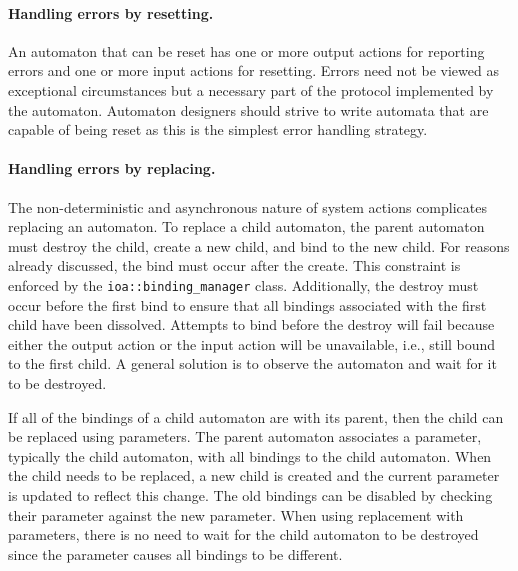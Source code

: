 \paragraph{Handling errors by resetting.}
An automaton that can be reset has one or more output actions for reporting errors and one or more input actions for resetting.
Errors need not be viewed as exceptional circumstances but a necessary part of the protocol implemented by the automaton.
Automaton designers should strive to write automata that are capable of being reset as this is the simplest error handling strategy.

\paragraph{Handling errors by replacing.}
The non-deterministic and asynchronous nature of system actions complicates replacing an automaton.
To replace a child automaton, the parent automaton must destroy the child, create a new child, and bind to the new child.
For reasons already discussed, the bind must occur after the create.
This constraint is enforced by the \verb+ioa::binding_manager+ class.
Additionally, the destroy must occur before the first bind to ensure that all bindings associated with the first child have been dissolved.
Attempts to bind before the destroy will fail because either the output action or the input action will be unavailable, i.e., still bound to the first child.
A general solution is to observe the automaton and wait for it to be destroyed.

If all of the bindings of a child automaton are with its parent, then the child can be replaced using parameters.
The parent automaton associates a parameter, typically the child automaton, with all bindings to the child automaton.
When the child needs to be replaced, a new child is created and the current parameter is updated to reflect this change.
The old bindings can be disabled by checking their parameter against the new parameter.
When using replacement with parameters, there is no need to wait for the child automaton to be destroyed since the parameter causes all bindings to be different.



